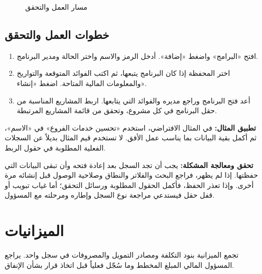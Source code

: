 \begin{figure}[H]
\centering
{}
\rclegend
\caption{مسار العمل والتحقق}
\label{fig:projects-programs-flow}
\end{figure}

\subsection{خطوات العمل والتحقق}
\begin{enumerate}
\item افتح «البرامج» واضغط «إضافة». أدخل الرمز والاسم واختر الحالة ومدير البرنامج.
\item اختر المحفظة إذا كان البرنامج يتبعها، ثم اكتب الفوائد المتوقعة والتواريخ والمعلومات المالية المتاحة. اضغط «إنشاء».
\item أعد فتح البرنامج وراجع مديره والفوائد التي يتابعها. اربط المشاريع المناسبة من حقل البرنامج في كل مشروع، وتحقق من قائمة المشاريع المرتبطة.
\end{enumerate}

\textbf{تطبيق المثال:} في المثال الافتراضي، استخدم «تحسين خدمات الفروع» في «الاسم»، ثم أكمل بقية البيانات بما يناسب عمل الأفق. لا تستخدم قيم المثال بديلاً عن السجلات الفعلية المطلوبة في حقول الربط.

\textbf{تحقق ومعالجة المشكلة:} يجب أن تجد السجل بعد إعادة فتحه وأن تبقى البيانات التي حفظتها. إذا لم يظهر، فراجع البحث والفلاتر والنطاق وصلاحية الوصول قبل إنشائه مرة أخرى. وإذا تعذر الحفظ، فأكمل الحقول المطلوبة ورسائل التحقق؛ أما غياب تبويب أو قفل حقل فيستدعي مراجعة نوع السجل وإطاره ومرحلته مع المسؤول.

\clearpage
\section{الميزانيات}
\label{sec:projects-feature-budgets}

تجمع الميزانية بنود التكلفة ومصادر التمويل والمصروفات في سجل واحد. يراجع المسؤول المالي المبلغ المخطط وما سُجّل فعلياً قبل اتخاذ قرار بشأن الإنفاق.

